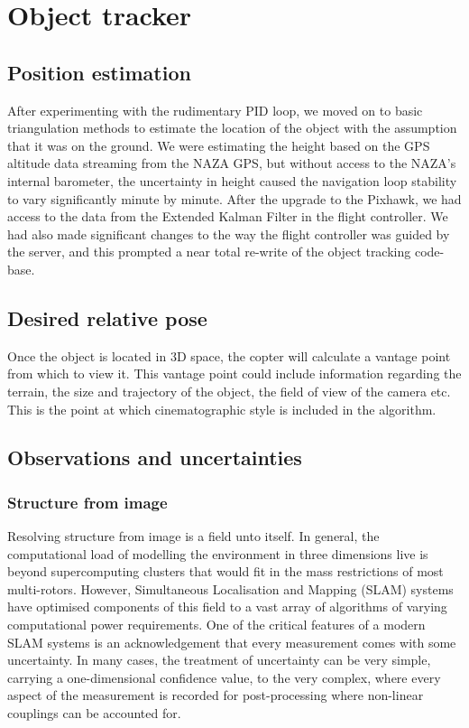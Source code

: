 \documentclass[a4paper, 11pt, titlepage]{article}
\begin{document}
\section{Object tracker}
  

  \subsection{Position estimation}
    After experimenting with the rudimentary PID loop, we moved on to basic triangulation methods to estimate the location of the object with the assumption that it was on the ground.  We were estimating the height based on the GPS altitude data streaming from the NAZA GPS, but without access to the NAZA's internal barometer, the uncertainty in height caused the navigation loop stability to vary significantly minute by minute.
    After the upgrade to the Pixhawk, we had access to the data from the Extended Kalman Filter in the flight controller.  We had also made significant changes to the way the flight controller was guided by the server, and this prompted a near total re-write of the object tracking code-base.

  \subsection{Desired relative pose}
    Once the object is located in 3D space, the copter will calculate a vantage point from which to view it.
    This vantage point could include information regarding the terrain, the size and trajectory of the object, the field of view of the camera etc.  This is the point at which cinematographic style is included in the algorithm.

  \subsection{Observations and uncertainties}
    \subsubsection{Structure from image}
      Resolving structure from image is a field unto itself.  In general, the computational load of modelling the environment in three dimensions live is beyond supercomputing clusters that would fit in the mass restrictions of most multi-rotors.  However, Simultaneous Localisation and Mapping (SLAM) systems have optimised components of this field to a vast array of algorithms of varying computational power requirements.
      One of the critical features of a modern SLAM systems is an acknowledgement that every measurement comes with some uncertainty. 
      In many cases, the treatment of uncertainty can be very simple, carrying a one-dimensional confidence value, to the very complex, where every aspect of the measurement is recorded for post-processing where non-linear couplings can be accounted for.
\end{document}
